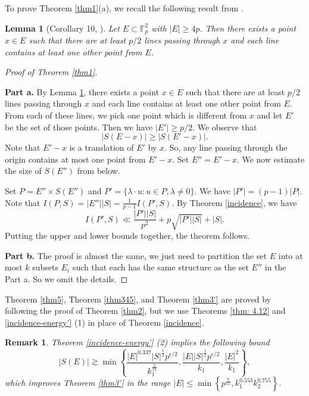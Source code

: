 \documentclass[11pt]{article}
\newtheorem{remark}[theorem]{Remark}
\newtheorem{lemma}[theorem]{Lemma}
\def\lv{\left\vert}
\def\rv{\right\vert}
\def\lo{\left\{}
\def\ro{\right\}}
\begin{document}
To prove Theorem \ref{thm1}(a), we recall the following result from \cite{L.P.V.18}. 

\begin{lemma}[Corollary 10, \cite{L.P.V.18}]\label{exist}
    Let $E\subset \mathbb{F}_p^2$ with $|E|\ge 4p$. Then there exists a point $x\in E$ such that there are at least $p/2$ lines passing through $x$ and each line contains at least one other point from $E$. 
\end{lemma}


\begin{proof}[Proof of Theorem \ref{thm1}]\,
\medskip

{\bf Part a.}
    By Lemma \ref{exist}, there exists a point $x\in E$ such that there are at least $p/2$ lines passing through $x$ and each line contains at least one other point from $E$. From each of these lines, we pick one point which is different from $x$ and let $E'$ be the set of those points. Then we have $|E'|\ge p/2$. We observe that 
    \[|S(E-x)|\ge |S(E'-x)|.\]
    Note that $E'-x$ is a translation of $E'$ by $x$. So, any line passing through the origin contains at most one point from $E'-x$. Set $E''=E'-x$. We now estimate the size of $S(E'')$ from below. 

Set $P=E''\times S(E'')$ and $P'=\{\lambda\cdot u\colon u\in P, \lambda\ne 0\}$. We have $|P'|=(p-1)|P|$.
    Note that $I(P, S)=|E''||S|=\frac{1}{p-1}I(P', S)$. 
By Theorem \ref{incidence}, we have     
\[I(P', S)\ll \frac{|P'||S|}{p^2}+p\sqrt{|P'||S|} + \lv S\rv .\]
Putting the upper and lower bounds together, the theorem follows. 

{\bf Part b.} The proof is almost the same, we just need to partition the set $E$ into at most $k$ subsets $E_i$ such that each has the same structure as the set $E''$ in the Part a. So we omit the details.
\end{proof}

Theorem \ref{thm5}, Theorem \ref{thm345}, and Theorem \ref{thm3'} are proved by following the proof of Theorem \ref{thm2}, but we use Theorems \ref{thm: 4.12} and \ref{incidence-energy'} (1) in place of Theorem \ref{incidence}.

\begin{remark}
Theorem \ref{incidence-energy'} (2) implies the following bound
     \[ \lv S(E)\rv \gtrsim \min \lo \frac{\lv E\rv^{0.337} \lv S\rv^{\frac{1}{2}}p^{\epsilon /2}}{k_1^{\frac{2}{15}}}, \frac{\lv E\rv \lv S\rv^{\frac{1}{2}}p^{\epsilon /2}}{k_1}, \frac{\lv E\rv^2}{k_1}  \ro,\]
     which improves Theorem \ref{thm3'} in the range $|E|\le \min \lo p^{\frac{8}{15}} , k_1^{0.553}k_2^{0.755} \ro$. 
\end{remark}
\end{document}
